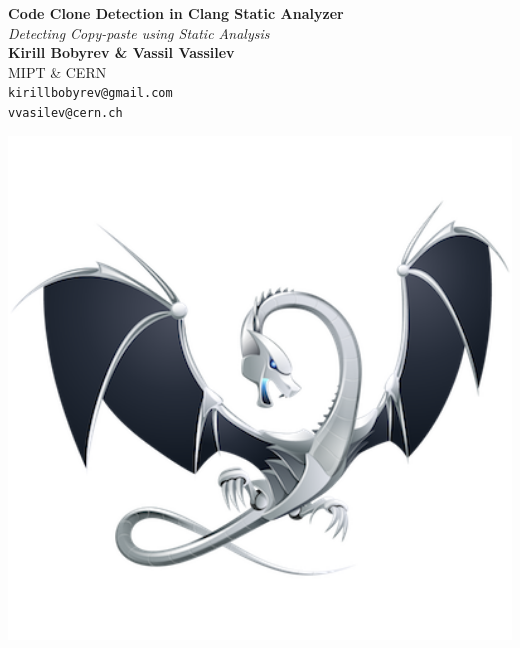 \documentclass[a0,portrait]{a0poster}
\begin{document}

\begin{minipage}[b]{0.75\linewidth}
\veryHuge \textbf{Code Clone Detection in Clang Static Analyzer} \color{Black}\\ %
\Huge\textit{Detecting Copy-paste using Static Analysis}\\[2cm] %
\huge \textbf{Kirill Bobyrev \& Vassil Vassilev}\\[0.5cm] %
\huge MIPT \& CERN\\[0.4cm] %
\Large \texttt{kirillbobyrev@gmail.com}\\
\Large \texttt{vvasilev@cern.ch}\\
\end{minipage}
%
\begin{minipage}[b]{0.25\linewidth}
\includegraphics[width=20cm]{logo.png}\\
\end{minipage}

\vspace{1cm} %
\end{document}
